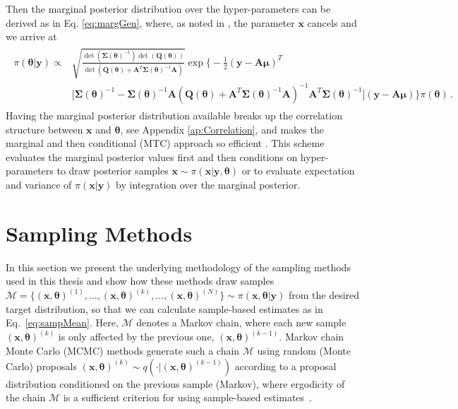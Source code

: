Then the marginal posterior distribution over the hyper-parameters can be derived as in Eq. \ref{eq:margGen}, where, as noted in \cite{fox2016fast}, the parameter $\bm{x}$ cancels and we arrive at
\begin{align}\begin{split}
		\pi(\bm{\theta} | \bm{y}) \propto & \sqrt{\frac{\det{(\bm{\Sigma}(\bm{\theta})^{-1})} \det{(\bm{Q}(\bm{\theta}))} }{\det{(\bm{Q}(\bm{\theta}) + \bm{A}^T \bm{\Sigma}(\bm{\theta})^{-1} \bm{A})} } }  \exp \Bigg\{  -\frac{1}{2} (\bm{y} - \bm{A} \bm{\mu})^T \\ &\big[ \bm{\Sigma}(\bm{\theta})^{-1} - \bm{\Sigma}(\bm{\theta})^{-1} \bm{A}  (\bm{Q}(\bm{\theta}) + \bm{A}^T \bm{\Sigma}(\bm{\theta})^{-1} \bm{A})^{-1} \bm{A}^T \bm{\Sigma} (\bm{\theta})^{-1} \big] (\bm{y} - \bm{A} \bm{\mu}) \Bigg\} \pi(\bm{\theta}) \, .
	\end{split} 
\end{align} 
Having the marginal posterior distribution available breaks up the correlation structure between $\bm{x}$ and $\bm{\theta}$, see Appendix \ref{ap:Correlation}, and makes the marginal and then conditional (MTC) approach so efficient \cite{fox2016fast}.
This scheme evaluates the marginal posterior values first and then conditions on hyper-parameters to draw posterior samples $\bm{x} \sim \pi (\bm{x} | \bm{y}, \bm{\theta})$ or to evaluate expectation and variance of $\pi(\bm{x}| \bm{y})$ by integration over the marginal posterior.




\section{Sampling Methods}
\label{sec:sampling}
In this section we present the underlying methodology of the sampling methods used in this thesis and show how these methods draw samples \newline$ \mathcal{M} = \{ (\bm{x}, \bm{\theta} )^{(1)}, \dots, (\bm{x}, \bm{\theta} )^{(k)}, \dots, (\bm{x}, \bm{\theta})^{(N)} \} \sim \pi(\bm{x}, \bm{\theta} |  \bm{y})$ from the desired target distribution, so that we can calculate sample-based estimates as in Eq.~\ref{eq:sampMean}.
Here, $\mathcal{M}$ denotes a Markov chain, where each new sample $(\bm{x}, \bm{\theta})^{(k)}$ is only affected by the previous one, $(\bm{x}, \bm{\theta})^{(k-1)}$.
Markov chain Monte Carlo (MCMC) methods generate such a chain $\mathcal{M}$ using random (Monte Carlo) proposals $(\bm{x}, \bm{\theta})^{(k)} \sim q( \cdot |  (\bm{x}, \bm{\theta})^{(k-1)})$ according to a proposal distribution conditioned on the previous sample (Markov), where ergodicity of the chain $\mathcal{M}$ is a sufficient criterion for using sample-based estimates~\cite{tan2016LecNot, roberts2004general}.

